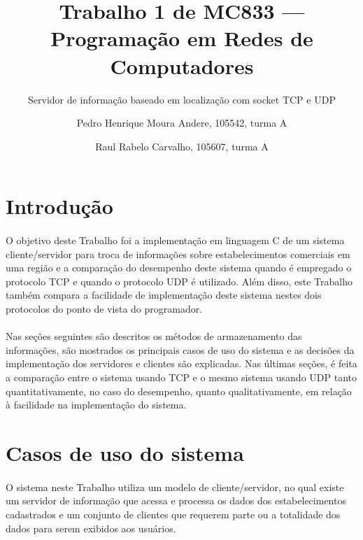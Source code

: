 \documentclass[a4paper,10pt,oneside,final,titlepage,onecolumn]{scrartcl}
\title{Trabalho 1 de MC833 --- Programação em Redes de Computadores}
\subtitle{Servidor de informação baseado em localização com socket TCP e UDP}
\author{Pedro Henrique Moura Andere, 105542, turma A\and Raul Rabelo Carvalho, 105607, turma A}
\begin{document}
\maketitle



\section{Introdução}
\paragraph{}O objetivo deste Trabalho foi a implementação em linguagem C de um sistema cliente/servidor para troca de informações sobre estabelecimentos comerciais em uma região e a comparação do desempenho deste sistema quando é empregado o protocolo TCP e quando o protocolo UDP é utilizado. Além disso, este Trabalho também compara a facilidade de implementação deste sistema nestes dois protocolos do ponto de vista do programador.
\paragraph{}Nas seções seguintes são descritos os métodos de armazenamento das informações, são mostrados os principais casos de uso do sistema e as decisões da implementação dos servidores e clientes são explicadas. Nas últimas seções, é feita a comparação entre o sistema usando TCP e o mesmo sistema usando UDP tanto quantitativamente, no caso do desempenho, quanto qualitativamente, em relação à facilidade na implementação do sistema.



\FloatBarrier

\section{Casos de uso do sistema}
\paragraph{}O sistema neste Trabalho utiliza um modelo de cliente/servidor, no qual existe um servidor de informação que acessa e processa os dados dos estabelecimentos cadastrados e um conjunto de clientes que requerem parte ou a totalidade dos dados para serem exibidos aos usuários.
\end{document}
